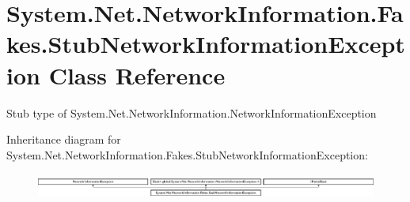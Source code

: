 \hypertarget{class_system_1_1_net_1_1_network_information_1_1_fakes_1_1_stub_network_information_exception}{\section{System.\-Net.\-Network\-Information.\-Fakes.\-Stub\-Network\-Information\-Exception Class Reference}
\label{class_system_1_1_net_1_1_network_information_1_1_fakes_1_1_stub_network_information_exception}
}


Stub type of System.\-Net.\-Network\-Information.\-Network\-Information\-Exception 


Inheritance diagram for System.\-Net.\-Network\-Information.\-Fakes.\-Stub\-Network\-Information\-Exception\-:\begin{figure}[H]
\begin{center}
\leavevmode
\includegraphics[height=0.825959cm]{class_system_1_1_net_1_1_network_information_1_1_fakes_1_1_stub_network_information_exception}
\end{center}
\end{figure}
